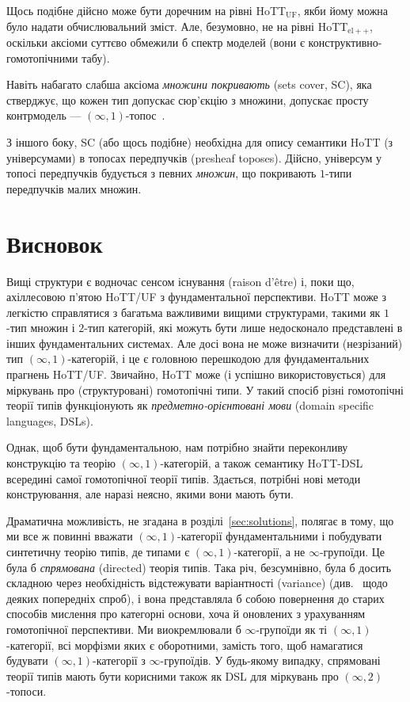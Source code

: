 \documentclass[12pt]{article}
\newcommand*{\inftyone}{\ensuremath{(\infty,1)}}
\newcommand*{\HoTTelp}{HoTT$_{\mathrm{el}{+}{+}}$}
\newcommand*{\HoTTuf}{HoTT$_{\mathrm{UF}}$}
\begin{document}
Щось подібне дійсно може бути доречним на рівні \HoTTuf, якби йому можна було надати обчислювальний зміст. Але, безумовно, не на рівні \HoTTelp, оскільки аксіоми суттєво обмежили б спектр моделей (вони є конструктивно-гомотопічними табу).

Навіть набагато слабша аксіома \emph{множини покривають} (sets cover, SC), яка стверджує, що кожен тип допускає сюр'єкцію з множини, допускає просту контрмодель — \inftyone-топос~\cite{nLabTypesCover}.

З іншого боку, SC (або щось подібне) необхідна для опису семантики HoTT (з універсумами) в топосах передпучків (presheaf toposes). Дійсно, універсум у топосі передпучків будується з певних \emph{множин}, що покривають $1$-типи передпучків малих множин.

\section{Висновок}
\label{sec:conclusion}

Вищі структури є водночас сенсом існування (raison d'{\^e}tre) і, поки що, ахіллесовою п'ятою HoTT/UF з фундаментальної перспективи. HoTT може з легкістю справлятися з багатьма важливими вищими структурами, такими як $1$-тип множин і $2$-тип категорій, які можуть бути лише недосконало представлені в інших фундаментальних системах. Але досі вона не може визначити (незрізаний) тип \inftyone-категорій, і це є головною перешкодою для фундаментальних прагнень HoTT/UF. Звичайно, HoTT може (і успішно використовується) для міркувань про (структуровані) гомотопічні типи. У такий спосіб різні гомотопічні теорії типів функціонують як \emph{предметно-орієнтовані мови} (domain specific languages, DSLs).

Однак, щоб бути фундаментальною, нам потрібно знайти переконливу конструкцію та теорію \inftyone-категорій, а також семантику HoTT-DSL всередині самої гомотопічної теорії типів. Здається, потрібні нові методи конструювання, але наразі неясно, якими вони мають бути.

Драматична можливість, не згадана в розділі~\ref{sec:solutions}, полягає в тому, що ми все ж повинні вважати \inftyone-категорії фундаментальними і побудувати синтетичну теорію типів, де типами є \inftyone-категорії, а не $\infty$-групоїди. Це була б \emph{спрямована} (directed) теорія типів. Така річ, безсумнівно, була б досить складною через необхідність відстежувати варіантності (variance) (див.~\cite{LicataHarper2011,Nuyts2015} щодо деяких попередніх спроб), і вона представляла б собою повернення до старих способів мислення про категорні основи, хоча й оновлених з урахуванням гомотопічної перспективи. Ми виокремлювали б $\infty$-групоїди як ті \inftyone-категорії, всі морфізми яких є оборотними, замість того, щоб намагатися будувати \inftyone-категорії з $\infty$-групоїдів. У будь-якому випадку, спрямовані теорії типів мають бути корисними також як DSL для міркувань про $(\infty,2)$-топоси.
\end{document}
